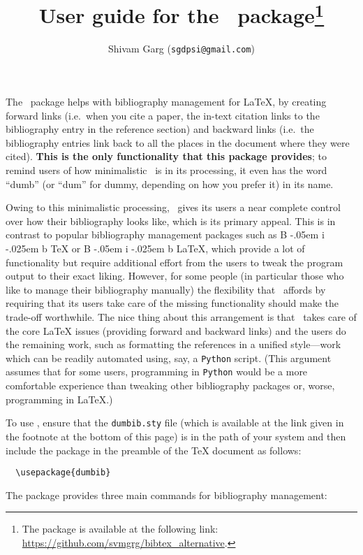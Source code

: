 \documentclass[letter, 11pt]{article}
\title{User guide for the \dumbib\ package\footnote{The package is available at the following link: \url{https://github.com/svmgrg/bibtex_alternative}.}}
\author{Shivam Garg (\texttt{sgdpsi@gmail.com})}
\def\Bib{%
  {%
    \rm
    B%
    \kern-.05em%
    {%
      \sc
      i%
      \kern-.025em %
      b%
    }%
  }%
}
\begin{document}
\maketitle

The \dumbib\ package helps with bibliography management for \LaTeX{}, by creating forward links (i.e.\ when you cite a paper, the in-text citation links to the bibliography entry in the reference section) and backward links (i.e.\ the bibliography entries link back to all the places in the document where they were cited). \textbf{This is the only functionality that this package provides}; to remind users of how minimalistic \dumbib\ is in its processing, it even has the word ``dumb'' (or ``dum'' for dummy, depending on how you prefer it) in its name.

Owing to this minimalistic processing, \dumbib\ gives its users a near complete control over how their bibliography looks like, which is its primary appeal. This is in contrast to popular bibliography management packages such as \Bib\TeX{} or \Bib\LaTeX, which provide a lot of functionality but require additional effort from the users to tweak the program output to their exact liking. However, for some people (in particular those who like to manage their bibliography manually) the flexibility that \dumbib\ affords by requiring that its users take care of the missing functionality should make the trade-off worthwhile. The nice thing about this arrangement is that \dumbib\ takes care of the core \LaTeX{} issues (providing forward and backward links) and the users do the remaining work, such as formatting the references in a unified style---work which can be readily automated using, say, a \texttt{Python} script. (This argument assumes that for some users, programming in \texttt{Python} would be a more comfortable experience than tweaking other bibliography packages or, worse, programming in \LaTeX.)

To use \dumbib, ensure that the \texttt{dumbib.sty} file (which is available at the link given in the footnote at the bottom of this page) is in the path of your system and then include the package in the preamble of the \TeX{} document as follows:
\begin{verbatim}
  \usepackage{dumbib}
\end{verbatim}
The package provides three main commands for bibliography management:
\end{document}
